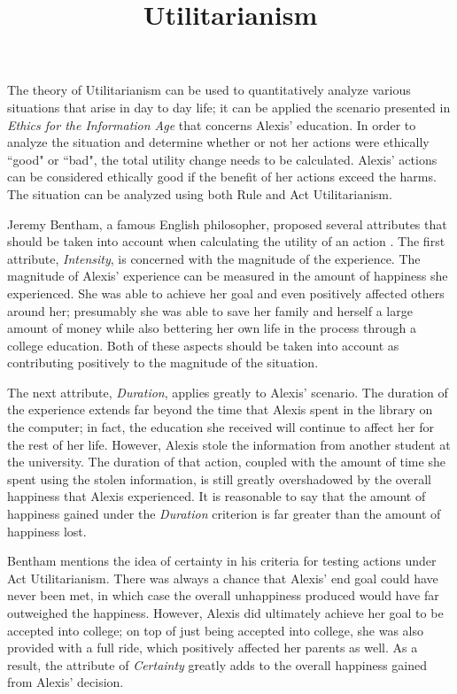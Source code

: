 \documentclass{paper}
\title{Utilitarianism}
\begin{document}
\drafth{}
\inlinetitle

The theory of Utilitarianism can be used to quantitatively analyze various situations that arise in day to day life; it can be applied the scenario presented in \textit{Ethics for the Information Age} that concerns Alexis' education. In order to analyze the situation and determine whether or not her actions were ethically ``good" or ``bad", the total utility change needs to be calculated. Alexis' actions can be considered ethically good if the benefit of her actions exceed the harms. The situation can be analyzed using both Rule and Act Utilitarianism.

Jeremy Bentham, a famous English philosopher, proposed several attributes that should be taken into account when calculating the utility of an action \cite[75]{ethics}. The first attribute, \textit{Intensity}, is concerned with the magnitude of the experience. The magnitude of Alexis' experience can be measured in the amount of happiness she experienced. She was able to achieve her goal and even positively affected others around her; presumably she was able to save her family and herself a large amount of money while also bettering her own life in the process through a college education. Both of these aspects should be taken into account as contributing positively to the magnitude of the situation.

The next attribute, \textit{Duration}, applies greatly to Alexis' scenario. The duration of the experience extends far beyond the time that Alexis spent in the library on the computer; in fact, the education she received will continue to affect her for the rest of her life. However, Alexis stole the information from another student at the university. The duration of that action, coupled with the amount of time she spent using the stolen information, is still greatly overshadowed by the overall happiness that Alexis experienced. It is reasonable to say that the amount of happiness gained under the \textit{Duration} criterion is far greater than the amount of happiness lost.

Bentham mentions the idea of certainty in his criteria for testing actions under Act Utilitarianism. There was always a chance that Alexis' end goal could have never been met, in which case the overall unhappiness produced would have far outweighed the happiness. However, Alexis did ultimately achieve her goal to be accepted into college; on top of just being accepted into college, she was also provided with a full ride, which positively affected her parents as well. As a result, the attribute of \textit{Certainty} greatly adds to the overall happiness gained from Alexis' decision.
\end{document}
